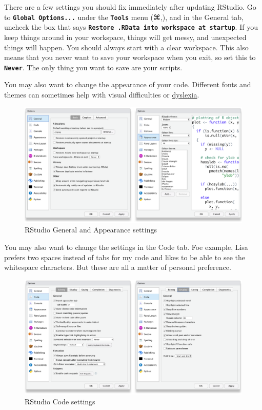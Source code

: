 \documentclass[
  oneside]{book}
\begin{document}
There are a few settings you should fix immediately after updating RStudio. Go to \textbf{\texttt{Global\ Options...}} under the \textbf{\texttt{Tools}} menu (⌘,), and in the General tab, uncheck the box that says \textbf{\texttt{Restore\ .RData\ into\ workspace\ at\ startup}}. If you keep things around in your workspace, things will get messy, and unexpected things will happen. You should always start with a clear workspace. This also means that you never want to save your workspace when you exit, so set this to \textbf{\texttt{Never}}. The only thing you want to save are your scripts.

You may also want to change the appearance of your code. Different fonts and themes can sometimes help with visual difficulties or \href{https://datacarpentry.org/blog/2017/09/coding-and-dyslexia}{dyslexia}.

\begin{figure}

{\centering \includegraphics[width=1\linewidth]{images/rstudio_settings_general_appearance} 

}

\caption{RStudio General and Appearance settings}\label{fig:settings-general}
\end{figure}

You may also want to change the settings in the Code tab. Foe example, Lisa prefers two spaces instead of tabs for my code and likes to be able to see the whitespace characters. But these are all a matter of personal preference.

\begin{figure}

{\centering \includegraphics[width=1\linewidth]{images/rstudio_settings_code} 

}

\caption{RStudio Code settings}\label{fig:settings-code}
\end{figure}
\end{document}
